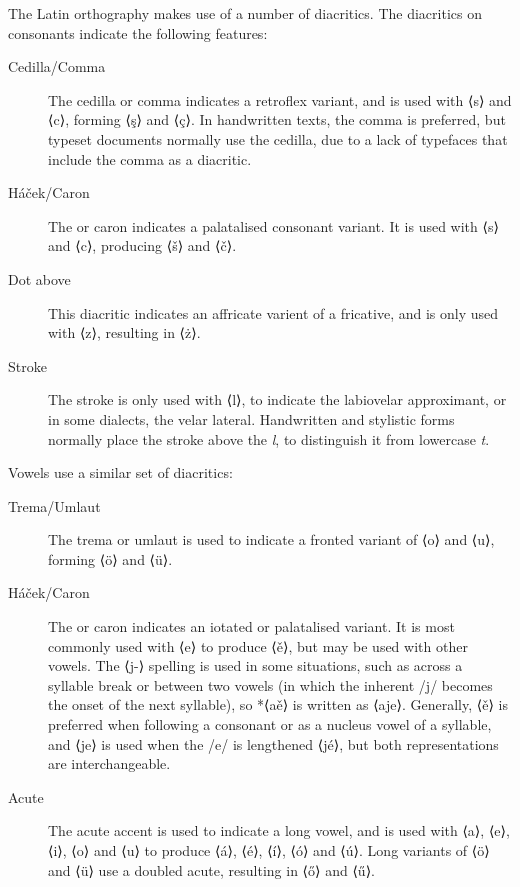 \documentclass[grammar]{subfiles}
\begin{document}
  \pagebreak[2]
  The Latin orthography makes use of a number of diacritics. The diacritics on consonants indicate the following features:

  \begin{description}
    \item[Cedilla/Comma] The cedilla or comma indicates a retroflex variant, and is used with ⟨s⟩ and ⟨c⟩, forming ⟨ş⟩ and ⟨ç⟩. In handwritten texts, the comma is preferred, but typeset documents normally use the cedilla, due to a lack of typefaces that include the comma as a diacritic.
    \item[Háček/Caron] The  or caron indicates a palatalised consonant variant. It is used with ⟨s⟩ and ⟨c⟩, producing ⟨š⟩ and ⟨č⟩.
    \item[Dot above] This diacritic indicates an affricate varient of a fricative, and is only used with ⟨z⟩, resulting in ⟨ż⟩.
    \item[Stroke] The stroke is only used with ⟨l⟩, to indicate the labiovelar approximant, or in some dialects, the velar lateral. Handwritten and stylistic forms normally place the stroke above the \textit l, to distinguish it from lowercase \textit t.
  \end{description}

  \pagebreak[2]
  Vowels use a similar set of diacritics:

  \begin{description}
    \item[Trema/Umlaut] The trema or umlaut is used to indicate a fronted variant of ⟨o⟩ and ⟨u⟩, forming ⟨ö⟩ and ⟨ü⟩.
    \item[Háček/Caron]\label{def:hacek} The  or caron indicates an iotated or palatalised variant. It is most commonly used with ⟨e⟩ to produce ⟨ě⟩, but may be used with other vowels. The ⟨j-⟩ spelling is used in some situations, such as across a syllable break or between two vowels (in which the inherent /j/ becomes the onset of the next syllable), so *⟨aě⟩ is written as ⟨aje⟩. Generally, ⟨ě⟩ is preferred when following a consonant or as a nucleus vowel of a syllable, and ⟨je⟩ is used when the /e/ is lengthened ⟨jé⟩, but both representations are interchangeable.
    \item[Acute] The acute accent is used to indicate a long vowel, and is used with ⟨a⟩, ⟨e⟩, ⟨i⟩, ⟨o⟩ and ⟨u⟩ to produce ⟨á⟩, ⟨é⟩, ⟨í⟩, ⟨ó⟩ and ⟨ú⟩. Long variants of ⟨ö⟩ and ⟨ü⟩ use a doubled acute, resulting in ⟨ő⟩ and ⟨ű⟩. 
  \end{description}
\end{document}
